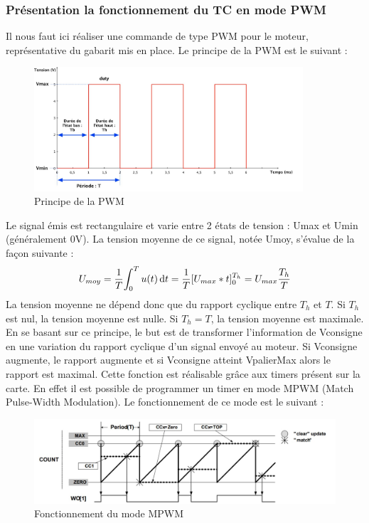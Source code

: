 \documentclass[a4paper]{article}
\begin{document}
	\subsubsection{Présentation la fonctionnement du TC en mode PWM}
	Il nous faut ici réaliser une commande de type PWM pour le moteur, représentative du gabarit mis en place. Le principe de la PWM est le suivant :  
	\begin{figure}[H]
	\centering
	\includegraphics[width=10cm]{CaracPWM.jpg}
	\caption{Principe de la PWM}
    \end{figure}
	Le  signal  émis  est  rectangulaire  et  varie  entre  2  états  de  tension :  Umax  et  Umin (généralement  0V). La  tension  moyenne  de  ce signal,  notée  Umoy,  s’évalue de  la  façon suivante :  
	\begin{equation}
		U_{moy} = {\frac 1T}{\int_0^T {u(t)} \,{\rm d}t} = {\frac 1T}{[U_{max}*t]_0^{T_{h}}} = {U_{max}}{\frac {T_{h}}T}
	\end{equation}
	La tension moyenne ne dépend donc que du rapport cyclique entre $T_{h}$ et $T$. Si $T_{h}$ est nul, la tension moyenne est nulle. Si $T_{h}=T$, la tension moyenne est maximale. \\
	En se basant sur ce principe, le but est de transformer l’information de Vconsigne en une variation du rapport cyclique d’un signal envoyé au moteur. Si Vconsigne augmente, le rapport augmente et si Vconsigne atteint VpalierMax alors le rapport est maximal. Cette fonction est réalisable  grâce aux timers présent sur la carte. En effet il est possible de programmer un timer en mode MPWM (Match Pulse-Width Modulation). Le fonctionnement de ce mode est le suivant :
	\begin{figure}[H]
	\centering
	\includegraphics[width=0.9\linewidth]{mode_MPWM.jpg}
	\caption{Fonctionnement du mode MPWM}
    \end{figure}
\end{document}
